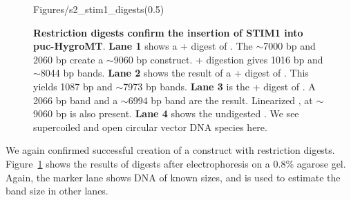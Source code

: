 \begin{figure}[ht!]
\begin{center}\vspace{-130pt}

	\begin{lpic}[]{Figures/s2_stim1_digests(0.5)}
		
	\end{lpic}\vspace{100pt}
	\caption[Restriction digests confirm the insertion of STIM1 into puc-HygroMT]{{\bfseries Restriction digests confirm the insertion of STIM1 into puc-HygroMT}. 		
	\textbf{Lane 1} shows a \stui+\xhoi{} digest of \stimivector. The $\sim$7000 bp \puchygmt{} and 2060 bp \stim{} create a $\sim$9060 bp construct. \stui+\xhoi{} digestion gives 1016 bp and $\sim$8044 bp bands. 
	\textbf{Lane 2} shows the result of a \bamhi+\stui{} digest of \stimivector. This yields 1087 bp and $\sim$7973 bp bands. 
	\textbf{Lane 3} is the \sali+\xbai{} digest of \stimivector. A 2066 bp band and a $\sim$6994 bp band are the result. Linearized \stimivector, at $\sim$9060 bp is also present.
	\textbf{Lane 4} shows the undigested \stimivector. We see supercoiled and open circular vector DNA species here.
	\label{fig:stim1_digests}}
\end{center}
\end{figure}




We again confirmed successful creation of a \stim{} construct with restriction digests.  Figure~\ref{fig:stim1_digests} shows the results of \stimivector{} digests after electrophoresis on a 0.8\% agarose gel. Again, the marker lane shows DNA of known sizes, and is used to estimate the band size in other lanes.  

